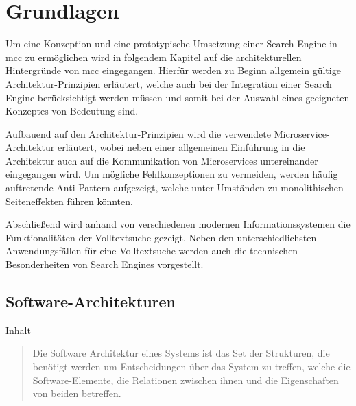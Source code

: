 \chapter{Grundlagen\label{chap2:Zweites-Kapitel}}

Um eine Konzeption und eine prototypische Umsetzung einer Search Engine in \gls{mcc} zu ermöglichen wird in folgendem Kapitel auf die architekturellen Hintergründe von \gls{mcc} eingegangen. Hierfür werden zu Beginn allgemein gültige Architektur-Prinzipien erläutert, welche auch bei der Integration einer Search Engine berücksichtigt werden müssen und somit bei der Auswahl eines geeigneten Konzeptes von Bedeutung sind.

Aufbauend auf den Architektur-Prinzipien wird die verwendete Microservice-Architektur erläutert, wobei neben einer allgemeinen Einführung in die Architektur auch auf die Kommunikation von Microservices untereinander eingegangen wird. Um mögliche Fehlkonzeptionen zu vermeiden, werden häufig auftretende Anti-Pattern aufgezeigt, welche unter Umständen zu monolithischen Seiteneffekten führen könnten.

Abschließend wird anhand von verschiedenen modernen Informationssystemen die Funktionalitäten der Volltextsuche gezeigt. Neben den unterschiedlichsten Anwendungsfällen für eine Volltextsuche werden auch die technischen Besonderheiten von Search Engines vorgestellt.


\section{Software-Architekturen\label{sec2.1:Unterpunkt-1}}

Inhalt

\begin{quote}
    Die Software Architektur eines Systems ist das Set der Strukturen, die benötigt werden um Entscheidungen über das System zu treffen, welche die Software-Elemente, die Relationen zwischen ihnen und die Eigenschaften von beiden betreffen. \cite{Bass.2013}
\end{quote}

